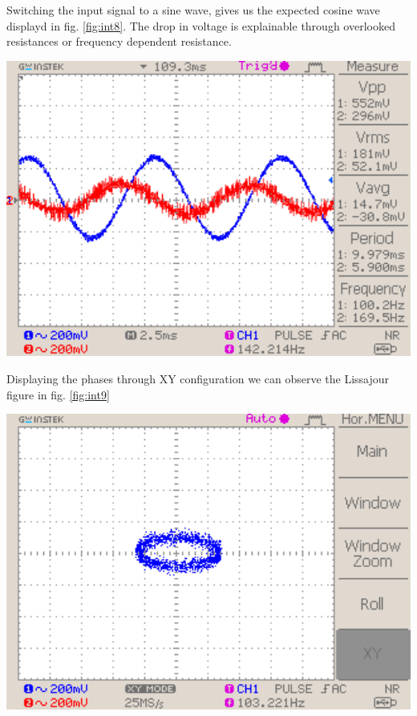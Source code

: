 \documentclass[a4paper,10pt]{article}
\newenvironment{Figure}
        {\par\medskip\noindent\minipage{\linewidth}}
        {\endminipage\par\medskip}
\numberwithin{equation}{section}
\begin{document}
\begin{multicols}{2}
  Switching the input signal to a sine wave, gives us the expected cosine wave displayd in fig. \ref{fig:int8}. The drop in voltage is explainable through overlooked resistances or frequency dependent resistance. 
	\begin{Figure}
		\centering
		\includegraphics[width=1\textwidth]{../data/DS0041_n.png}
		\label{fig:int8}
	\end{Figure}
  Displaying the phases through XY configuration we can observe the Lissajour figure in fig. \ref{fig:int9}
	\begin{Figure}
		\centering
		\includegraphics[width=1\textwidth]{../data/DS0040_n.png}
		\label{fig:int9}
	\end{Figure}
  

\end{multicols}
\end{document}
